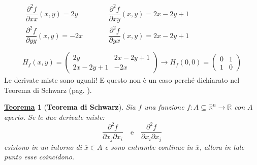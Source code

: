 \documentclass[a4paper]{article}
\newtheorem{theorem}{\textcolor{Red3}{\underline{Teorema}}}
\begin{document}
	\begin{gather*}
		\begin{array}{lcl}
			\dfrac{\partial^{2} f}{\partial xx}\left(x,y\right) = 2y
			&\hspace{2em}&
			\dfrac{\partial^{2} f}{\partial xy}\left(x,y\right) = 2x-2y+1 \\ [1em]
			\dfrac{\partial^{2} f}{\partial yy}\left(x,y\right) = -2x
			&\hspace{2em}&
			\dfrac{\partial^{2} f}{\partial yx}\left(x,y\right) = 2x-2y+1
		\end{array}
		\\ \\
		H_{f}\left(x,y\right) = 
		\begin{pmatrix}
			2y & 2x-2y+1 \\
			2x-2y+1 & -2x
		\end{pmatrix}
		\rightarrow
		H_{f}\left(0,0\right) = 
		\begin{pmatrix}
			0 & 1 \\
			1 & 0
		\end{pmatrix}
	\end{gather*}
	Le derivate miste sono uguali! E questo non è un caso perché dichiarato nel Teorema di Schwarz (pag. \pageref{theorem: Schwarz}).\newpage

	\begin{theorem}[\textbf{Teorema di Schwarz}]\label{theorem: Schwarz}
		Sia $f$ una funzione $f:A\subseteq \mathbb{R}^{n}\rightarrow\mathbb{R}$ con $A$ aperto. Se le due derivate miste:
		\begin{equation*}
			\dfrac{\partial^{2} f}{\partial x_{j} \partial x_{i}} \hspace{1em} \text{e} \hspace{1em} \dfrac{\partial^{2} f}{\partial x_{i} \partial x_{j}}
		\end{equation*}
		esistono in un intorno di $\overline{x} \in A$ e sono entrambe continue in $\overline{x}$, allora in tale punto esse coincidono.
	\end{theorem}
\end{document}
